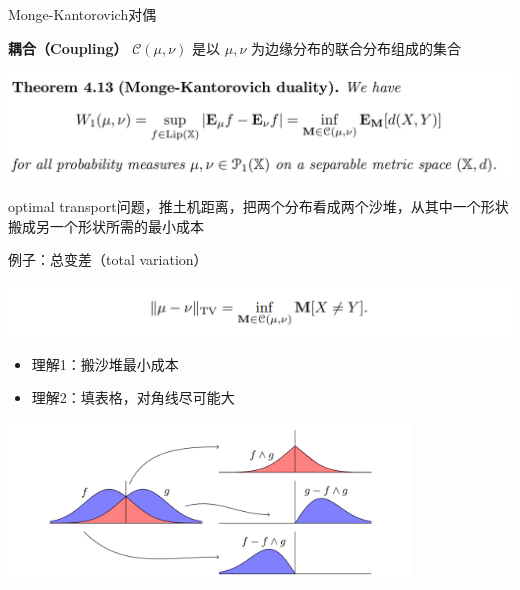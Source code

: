 \documentclass{beamer}
\begin{document}
\begin{frame}{Monge-Kantorovich对偶}

\textbf{耦合（Coupling）} $\mathcal{C}(\mu, \nu)$ 是以 $\mu, \nu$ 为边缘分布的联合分布组成的集合

\begin{center}
\includegraphics[width=1.0\textwidth, frame]{figures/4-13-thm.png}
\end{center}

optimal transport问题，推土机距离，把两个分布看成两个沙堆，从其中一个形状搬成另一个形状所需的最小成本

\end{frame}

\begin{frame}{例子：总变差（total variation）}

\begin{center}
\includegraphics[width=1.0\textwidth, frame]{figures/4-14-eg.png}
\end{center}

\begin{itemize}
    \item 理解1：搬沙堆最小成本
    \item 理解2：填表格，对角线尽可能大
\end{itemize}

\begin{center}
\includegraphics[width=0.8\textwidth, frame]{figures/4-14-fig.png}
\end{center}

\end{frame}
\end{document}
